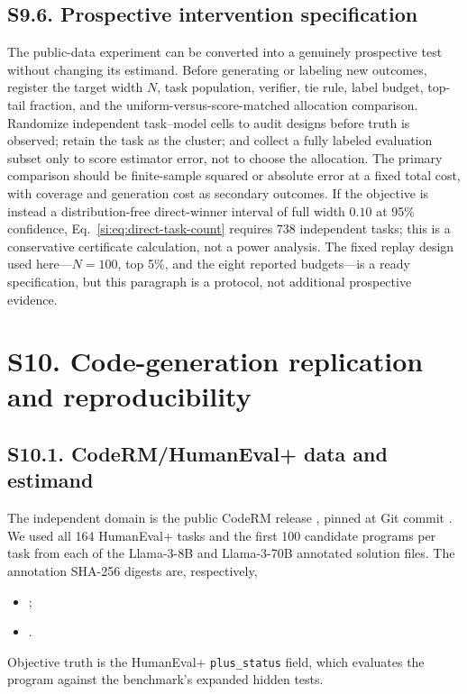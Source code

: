 \subsection*{S9.6. Prospective intervention specification}

The public-data experiment can be converted into a genuinely prospective test without changing its estimand. Before generating or labeling new outcomes, register the target width $N$, task population, verifier, tie rule, label budget, top-tail fraction, and the uniform-versus-score-matched allocation comparison. Randomize independent task--model cells to audit designs before truth is observed; retain the task as the cluster; and collect a fully labeled evaluation subset only to score estimator error, not to choose the allocation. The primary comparison should be finite-sample squared or absolute error at a fixed total cost, with coverage and generation cost as secondary outcomes. If the objective is instead a distribution-free direct-winner interval of full width $0.10$ at 95\% confidence, Eq.~\ref{si:eq:direct-task-count} requires 738 independent tasks; this is a conservative certificate calculation, not a power analysis. The fixed replay design used here---$N=100$, top 5\%, and the eight reported budgets---is a ready specification, but this paragraph is a protocol, not additional prospective evidence.

\section*{S10. Code-generation replication and reproducibility}

\subsection*{S10.1. CodeRM/HumanEval+ data and estimand}

The independent domain is the public CodeRM release \citep{ma2025}, pinned at Git commit \texttt{}. We used all 164 HumanEval+ tasks and the first 100 candidate programs per task from each of the Llama-3-8B and Llama-3-70B annotated solution files. The annotation SHA-256 digests are, respectively,
\begin{itemize}
\item \texttt{};
\item \texttt{}.
\end{itemize}
Objective truth is the HumanEval+ \texttt{plus\_status} field, which evaluates the program against the benchmark's expanded hidden tests.

